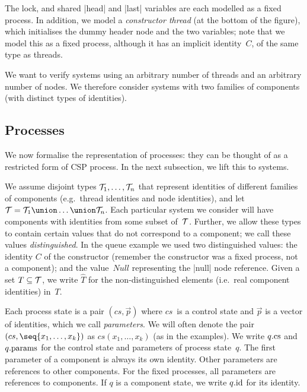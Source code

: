 The lock, and shared |head| and |last| variables are each modelled as a fixed
process.  In addition, we model a \emph{constructor thread} (at the bottom of
the figure), which initialises the dummy header node and the two variables;
note that we model this as a fixed process, although it has an implicit
identity~$C$, of the same type as threads.

We want to verify systems using an arbitrary number of threads and an
arbitrary number of nodes.  We therefore consider systems with two families of
components (with distinct types of identities). 




\subsection{Processes}

We now formalise the representation of processes: they can be thought of as a
restricted form of CSP process.  In the next subsection, we lift this to
systems.

We assume disjoint types $\mathcal{T}_1, \ldots, \mathcal{T}_n$ that represent identities of
different families of components (e.g.~thread identities and node
identities), and let $\T = \T_1 \union \ldots \union \T_n$.  Each particular
system we consider will have components with identities from some subset
of~$\mathcal{T}$. 
Further, we allow these types to contain certain values that do not correspond
to a component; we call these values \emph{distinguished}.  In the queue
example we used two distinguished values: the identity $C$ of the constructor
(remember the constructor was a fixed process, not a component); and the
value~$Null$ representing the |null| node reference.  Given a set
$T \subseteq \mathcal{T}$, we write $\hat{T}$ for the non-distinguished elements
(i.e.~real component identities) in~$T$. 

Each process state is a pair $(cs, \vec p)$ where $cs$~is a control state and
$\vec p$ is a vector of identities, which we call \emph{parameters}. We will
often denote the pair $(cs, \seq{x_1,\ldots,x_k})$ as $cs(x_1,\ldots,x_k)$ (as
in the examples).  We write $q.\mathrm{cs}$ and $q.\mathrm{params}$ for the control state and
parameters of process state~$q$.  The first parameter of a component is always
its own identity.  Other parameters are references to other components.  For
the fixed processes, all parameters are references to components.  If $q$ is a
component state, we write $q.\mathrm{id}$ for its identity.

